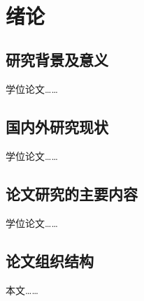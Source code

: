 \quad \\
\vspace{-20mm}

\section{绪论}

\subsection{研究背景及意义}
学位论文……

\subsection{国内外研究现状}
学位论文……

\subsection{论文研究的主要内容}
学位论文……

\subsection{论文组织结构}
本文……

\clearpage